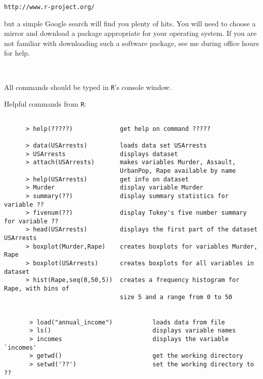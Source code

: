 \documentclass{report}
\begin{document}
\centerline{\tt http://www.r-project.org/}

\noindent but a simple Google search will find you plenty of hits.
You will need to choose a mirror and download a
package appropriate for your operating system.  If you are not
familiar with downloading such a software package, see me during
office hours for help.

\

\noindent All commands should be typed in {\tt R}'s console window.

\smallskip

Helpful commands from {\tt R}:

\begin{verbatim}

      > help(?????)             get help on command ?????

      > data(USArrests)         loads data set USArrests
      > USArrests               displays dataset
      > attach(USArrests)       makes variables Murder, Assault,
                                UrbanPop, Rape available by name
      > help(USArrests)         get info on dataset
      > Murder                  display variable Murder
      > summary(??)             display summary statistics for variable ??
      > fivenum(??)             display Tukey's five number summary for variable ??
      > head(USArrests)         displays the first part of the dataset USArrests
      > boxplot(Murder,Rape)    creates boxplots for variables Murder, Rape
      > boxplot(USArrests)      creates boxplots for all variables in dataset
      > hist(Rape,seq(0,50,5))  creates a frequency histogram for Rape, with bins of
                                size 5 and a range from 0 to 50
                                
                                
       > load("annual_income")           loads data from file
       > ls()                            displays variable names
       > incomes                         displays the variable `incomes'
       > getwd()                         get the working directory
       > setwd('??')                     set the working directory to ??
\end{verbatim}
\end{document}
